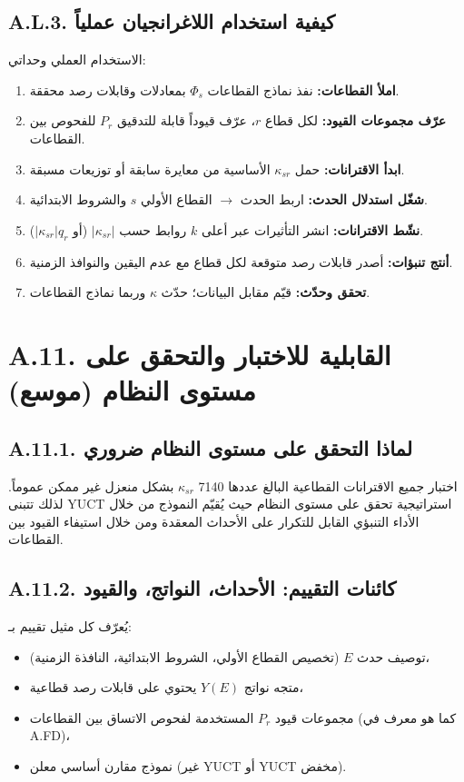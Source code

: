 \documentclass[13pt,a4paper]{article}
\begin{document}
	\subsection*{A.L.3. كيفية استخدام اللاغرانجيان عملياً}
	الاستخدام العملي وحداتي:
	\begin{enumerate}[leftmargin=*]
		\item \textbf{املأ القطاعات:} نفذ نماذج القطاعات $\Phi_s$ بمعادلات وقابلات رصد محققة.
		\item \textbf{عرّف مجموعات القيود:} لكل قطاع $r$، عرّف قيوداً قابلة للتدقيق $P_r$ للفحوص بين القطاعات.
		\item \textbf{ابدأ الاقترانات:} حمل $\kappa_{sr}$ الأساسية من معايرة سابقة أو توزيعات مسبقة.
		\item \textbf{شغّل استدلال الحدث:} اربط الحدث $\to$ القطاع الأولي $s$ والشروط الابتدائية.
		\item \textbf{نشّط الاقترانات:} انشر التأثيرات عبر أعلى $k$ روابط حسب $|\kappa_{sr}|$ (أو $|\kappa_{sr}|q_r$).
		\item \textbf{أنتج تنبؤات:} أصدر قابلات رصد متوقعة لكل قطاع مع عدم اليقين والنوافذ الزمنية.
		\item \textbf{تحقق وحدّث:} قيّم مقابل البيانات؛ حدّث $\kappa$ وربما نماذج القطاعات.
	\end{enumerate}
	
	\section*{A.11. القابلية للاختبار والتحقق على مستوى النظام (موسع)}
	\label{sec:extended-testability}
	
	\subsection*{A.11.1. لماذا التحقق على مستوى النظام ضروري}
	اختبار جميع الاقترانات القطاعية البالغ عددها 7140 $\kappa_{sr}$ بشكل منعزل غير ممكن عموماً. لذلك تتبنى YUCT استراتيجية تحقق على مستوى النظام حيث يُقيّم النموذج من خلال الأداء التنبؤي القابل للتكرار على الأحداث المعقدة ومن خلال استيفاء القيود بين القطاعات.
	
	\subsection*{A.11.2. كائنات التقييم: الأحداث، النواتج، والقيود}
	يُعرّف كل مثيل تقييم بـ:
	\begin{itemize}[leftmargin=*]
		\item توصيف حدث $E$ (تخصيص القطاع الأولي، الشروط الابتدائية، النافذة الزمنية)،
		\item متجه نواتج $Y(E)$ يحتوي على قابلات رصد قطاعية،
		\item مجموعات قيود $P_r$ المستخدمة لفحوص الاتساق بين القطاعات (كما هو معرف في A.FD)،
		\item نموذج مقارن أساسي معلن (غير YUCT أو YUCT مخفض).
	\end{itemize}
	
\end{document}
